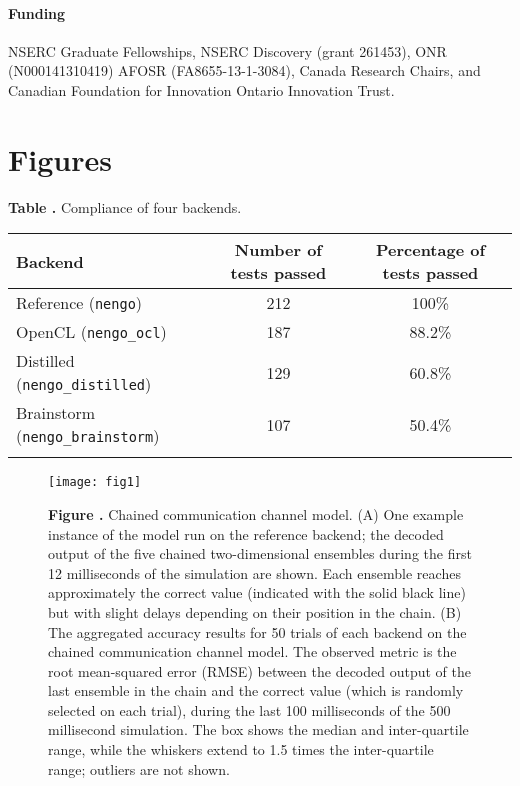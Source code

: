 \documentclass{frontiersSCNS}
\begin{document}
\paragraph{Funding\textcolon}
NSERC Graduate Fellowships,
NSERC Discovery (grant 261453),
ONR (N000141310419)
AFOSR (FA8655-13-1-3084),
Canada Research Chairs,
and Canadian Foundation for Innovation
Ontario Innovation Trust.




\section*{Figures}

\begin{table}[!ht]
\textbf{\label{Tab:01} Table .}{
  Compliance of four backends.}

\processtable{ }
{\begin{tabular}{lcc}\toprule
 Backend & Number of tests passed & Percentage of tests passed\\\midrule
 Reference (\texttt{nengo}) & 212 & 100\% \\
 OpenCL (\texttt{nengo\_ocl}) & 187 & 88.2\% \\
 Distilled (\texttt{nengo\_distilled}) & 129 & 60.8\% \\
 Brainstorm (\texttt{nengo\_brainstorm}) & 107 & 50.4\% \\\botrule
\end{tabular}}{}
\end{table}

\begin{figure}[!ht]
\begin{center}
  \texttt{[image: fig1]}
\end{center}
\textbf{\label{fig:01} Figure .}
       {Chained communication channel model. (A) One example instance
         of the model run on the reference backend; the decoded output
         of the five chained two-dimensional ensembles during the first
         12 milliseconds of the simulation are shown.
         Each ensemble reaches approximately the correct value
         (indicated with the solid black line)
         but with slight delays depending on their position in the chain.
         (B) The aggregated accuracy results for
         50 trials of each backend on the
         chained communication channel model. The observed metric is the root
         mean-squared error (RMSE) between the decoded output of the last
         ensemble in the chain and the correct value (which is randomly
         selected on each trial), during the last 100 milliseconds of the
         500 millisecond simulation. The box shows the median and
         inter-quartile range, while the whiskers extend to 1.5 times the
         inter-quartile range; outliers are not shown.}
\end{figure}
\end{document}
